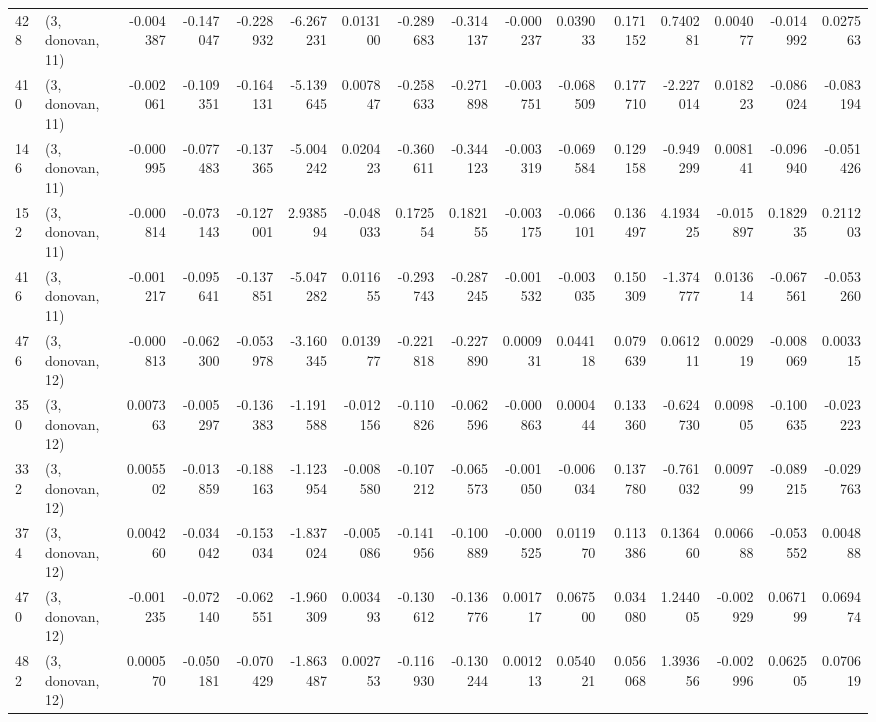 \begin{tabular}{llrrrrrrrrrrrrrr}
428 &  (3, donovan, 11) &  -0.004387 & -0.147047 & -0.228932 &  -6.267231 &  0.013100 &  -0.289683 & -0.314137 & -0.000237 &  0.039033 &  0.171152 &     0.740281 &   0.004077 &  -0.014992 &   0.027563 \\
410 &  (3, donovan, 11) &  -0.002061 & -0.109351 & -0.164131 &  -5.139645 &  0.007847 &  -0.258633 & -0.271898 & -0.003751 & -0.068509 &  0.177710 &    -2.227014 &   0.018223 &  -0.086024 &  -0.083194 \\
146 &  (3, donovan, 11) &  -0.000995 & -0.077483 & -0.137365 &  -5.004242 &  0.020423 &  -0.360611 & -0.344123 & -0.003319 & -0.069584 &  0.129158 &    -0.949299 &   0.008141 &  -0.096940 &  -0.051426 \\
152 &  (3, donovan, 11) &  -0.000814 & -0.073143 & -0.127001 &   2.938594 & -0.048033 &   0.172554 &  0.182155 & -0.003175 & -0.066101 &  0.136497 &     4.193425 &  -0.015897 &   0.182935 &   0.211203 \\
416 &  (3, donovan, 11) &  -0.001217 & -0.095641 & -0.137851 &  -5.047282 &  0.011655 &  -0.293743 & -0.287245 & -0.001532 & -0.003035 &  0.150309 &    -1.374777 &   0.013614 &  -0.067561 &  -0.053260 \\
476 &  (3, donovan, 12) &  -0.000813 & -0.062300 & -0.053978 &  -3.160345 &  0.013977 &  -0.221818 & -0.227890 &  0.000931 &  0.044118 &  0.079639 &     0.061211 &   0.002919 &  -0.008069 &   0.003315 \\
350 &  (3, donovan, 12) &   0.007363 & -0.005297 & -0.136383 &  -1.191588 & -0.012156 &  -0.110826 & -0.062596 & -0.000863 &  0.000444 &  0.133360 &    -0.624730 &   0.009805 &  -0.100635 &  -0.023223 \\
332 &  (3, donovan, 12) &   0.005502 & -0.013859 & -0.188163 &  -1.123954 & -0.008580 &  -0.107212 & -0.065573 & -0.001050 & -0.006034 &  0.137780 &    -0.761032 &   0.009799 &  -0.089215 &  -0.029763 \\
374 &  (3, donovan, 12) &   0.004260 & -0.034042 & -0.153034 &  -1.837024 & -0.005086 &  -0.141956 & -0.100889 & -0.000525 &  0.011970 &  0.113386 &     0.136460 &   0.006688 &  -0.053552 &   0.004888 \\
470 &  (3, donovan, 12) &  -0.001235 & -0.072140 & -0.062551 &  -1.960309 &  0.003493 &  -0.130612 & -0.136776 &  0.001717 &  0.067500 &  0.034080 &     1.244005 &  -0.002929 &   0.067199 &   0.069474 \\
482 &  (3, donovan, 12) &   0.000570 & -0.050181 & -0.070429 &  -1.863487 &  0.002753 &  -0.116930 & -0.130244 &  0.001213 &  0.054021 &  0.056068 &     1.393656 &  -0.002996 &   0.062505 &   0.070619 \\

\end{tabular}
